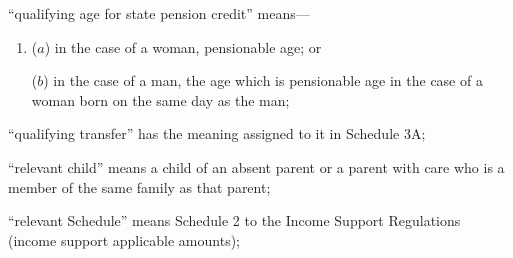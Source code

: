 \documentclass[12pt,a4paper]{article}
\begin{document}
\begin{enumerate}
“qualifying age for state pension credit” means—
\begin{enumerate}\item[]
($a$) 
in the case of a woman, pensionable age; or

($b$) 
in the case of a man, the age which is pensionable age in the case of a woman born on the same day as the man;
\end{enumerate}

“qualifying transfer” has the meaning assigned to it in Schedule 3A;

“relevant child” means a child of an absent parent or a parent with care who is a member of the same family as that parent;

“relevant Schedule” means Schedule 2 to the Income Support Regulations (income support applicable amounts);

%
%


\end{enumerate}
\end{document}
